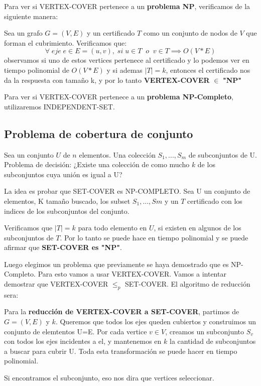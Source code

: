 \documentclass{article}
\begin{document}
Para ver si VERTEX-COVER pertenece a un \textbf{problema NP}, verificamos de la siguiente manera: 

Sea un grafo \(G=(V,E)\) y un certificado \(T\) como un conjunto de nodos de \(V\) que forman el cubrimiento. 
Verificamos que:
\[
    \forall \;eje\; e \in E=(u,v), \; si \; u\in T \;\; o \;\; v \in T \implies O(V*E)
\]
observamos si uno de estos vertices pertenece al certificado y lo podemos ver en tiempo polinomial de \(O(V*E)\) y si ademas \(|T|=k\), 
entonces el certificado nos da la respuesta con tamaño k, y por lo tanto \textbf{VERTEX-COVER} \(\in\) \textbf{"NP"}

Para ver si VERTEX-COVER pertenece a un \textbf{problema NP-Completo}, utilizaremos INDEPENDENT-SET.

\newpage
\subsection{Problema de cobertura de conjunto}

Sea un conjunto \(U\) de \(n\) elementos. Una colección \(S_1,...,S_m\) de subconjuntos de U. 
Problema de decisión: ¿Existe una colección de como mucho \(k\) de los subconjuntos cuya unión es igual a U?

La idea es probar que SET-COVER es NP-COMPLETO. Sea U un conjunto de elementos, 
K tamaño buscado, los subset \(S_1,...,Sm\) y un \(T\) certificado con los indices de los subconjuntos del conjunto.

Verificamos que \(|T|=k\) para todo elemento en \(U\), si existen en algunos de los subconjuntos de \(T\). 
Por lo tanto se puede hace en tiempo polinomial y se puede afirmar que \textbf{SET-COVER es "NP"}.

Luego elegimos un problema que previamente se haya demostrado que es NP-Completo. Para esto vamos a usar VERTEX-COVER.
Vamos a intentar demostrar que VERTEX-COVER \(\leq_p\) SET-COVER. El algoritmo de reducción sera:

\newpage
Para la \textbf{reducción de VERTEX-COVER a SET-COVER}, partimos de \(G=(V,E)\) y \(k\). Queremos que todos los ejes
queden cubiertos y construimos un conjunto de elemtentos U=E. Por cada vertice \(v \in V\), 
creamos un subconjunto \(S_v\) con todos los ejes incidentes a el, y mantenemos en \(k\) la cantidad
de subconjuntos a buscar para cubrir U. Toda esta transformación se puede hacer en tiempo polinomial.

Si encontramos el subconjunto, eso nos dira que vertices seleccionar.
\end{document}
